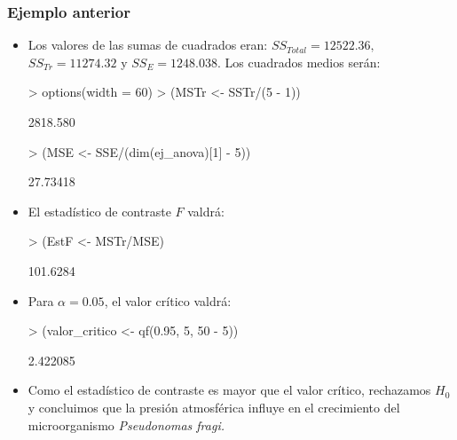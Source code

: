 \begin{frame}[fragile]
\frametitle{Ejemplo anterior}
\begin{itemize}
\item<2-> Los valores de las sumas de cuadrados eran: $SS_{Total}=12522.36,$ $SS_{Tr} = 11274.32$ y $SS_E=1248.038$. Los cuadrados medios serán:

{\small
\begin{Schunk}
\begin{Sinput}
> options(width = 60)
> (MSTr <- SSTr/(5 - 1))
\end{Sinput}
\begin{Soutput}
[1] 2818.580
\end{Soutput}
\end{Schunk}
}

{\small
\begin{Schunk}
\begin{Sinput}
> (MSE <- SSE/(dim(ej_anova)[1] - 5))
\end{Sinput}
\begin{Soutput}
[1] 27.73418
\end{Soutput}
\end{Schunk}
}

\item<3-> El estadístico de contraste $F$ valdrá:

{\small
\begin{Schunk}
\begin{Sinput}
> (EstF <- MSTr/MSE)
\end{Sinput}
\begin{Soutput}
[1] 101.6284
\end{Soutput}
\end{Schunk}
}

\item<4-> Para $\alpha =0.05$, el valor crítico valdrá:
{\small
\begin{Schunk}
\begin{Sinput}
> (valor_critico <- qf(0.95, 5, 50 - 5))
\end{Sinput}
\begin{Soutput}
[1] 2.422085
\end{Soutput}
\end{Schunk}
}

\item<4-> Como el estadístico de contraste es mayor que el valor crítico, rechazamos $H_0$ y concluimos que la presión atmosférica influye en el
crecimiento del microorganismo {\it Pseudonomas fragi.}
\end{itemize}
\end{frame}

